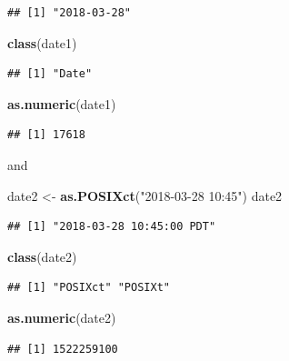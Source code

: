 \documentclass[]{book}
\newenvironment{Shaded}{\begin{snugshade}}{\end{snugshade}}
\newcommand{\KeywordTok}[1]{\textcolor[rgb]{0.13,0.29,0.53}{\textbf{#1}}}
\newcommand{\NormalTok}[1]{#1}
\newcommand{\StringTok}[1]{\textcolor[rgb]{0.31,0.60,0.02}{#1}}
\theoremstyle{definition}
\theoremstyle{definition}
\theoremstyle{definition}
\theoremstyle{remark}
\begin{document}
\begin{verbatim}
## [1] "2018-03-28"
\end{verbatim}

\begin{Shaded}
\begin{Highlighting}[]
\KeywordTok{class}\NormalTok{(date1)}
\end{Highlighting}
\end{Shaded}

\begin{verbatim}
## [1] "Date"
\end{verbatim}

\begin{Shaded}
\begin{Highlighting}[]
\KeywordTok{as.numeric}\NormalTok{(date1)}
\end{Highlighting}
\end{Shaded}

\begin{verbatim}
## [1] 17618
\end{verbatim}

and

\begin{Shaded}
\begin{Highlighting}[]
\NormalTok{date2 <-}\StringTok{ }\KeywordTok{as.POSIXct}\NormalTok{(}\StringTok{"2018-03-28 10:45"}\NormalTok{)}
\NormalTok{date2}
\end{Highlighting}
\end{Shaded}

\begin{verbatim}
## [1] "2018-03-28 10:45:00 PDT"
\end{verbatim}

\begin{Shaded}
\begin{Highlighting}[]
\KeywordTok{class}\NormalTok{(date2)}
\end{Highlighting}
\end{Shaded}

\begin{verbatim}
## [1] "POSIXct" "POSIXt"
\end{verbatim}

\begin{Shaded}
\begin{Highlighting}[]
\KeywordTok{as.numeric}\NormalTok{(date2)}
\end{Highlighting}
\end{Shaded}

\begin{verbatim}
## [1] 1522259100
\end{verbatim}
\end{document}
